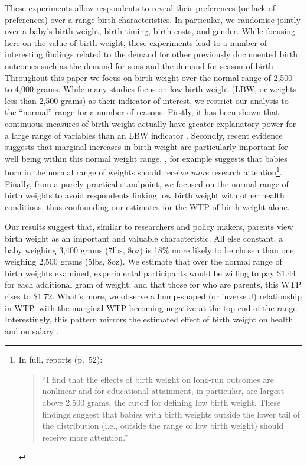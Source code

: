 \documentclass[a4paper, 11pt]{article}
\begin{document}
\begin{spacing}{1.4}
These experiments allow respondents to reveal their preferences (or lack
of preferences) over a range birth characteristics.  In particular, we
randomise jointly over a baby's birth weight, birth timing, birth costs,
and gender.  While focusing here on the value of birth weight, these
experiments lead to a number of interesting findings related to the
demand for other previously documented birth outcomes such as the demand
for sons \citep{DahlMoretti2008} and the demand for season of birth
\citep{Clarkeetal2016}.  Throughout this paper
we focus on birth weight over the normal range of 2,500 to 4,000 grams.
While many studies focus on low birth weight (LBW, or weights less than
2,500 grams) as their indicator of interest, we restrict our analysis
to the ``normal'' range for a number of reasons.  Firstly, it has been
shown that continuous measures of birth weight actually have greater
explanatory power for a large range of variables than an LBW indicator
\citep{Blacketal2007}.  Secondly, recent evidence suggests that marginal
increases in birth weight are particularly important for well being within
this normal weight range.  \citet{Royer2009}, for example suggests that
babies born in the normal range of weights should receive \emph{more}
research attention\footnote{In full, \citep{Royer2009} reports (p.\ 52):
  \begin{quote} ``I find that the effects of birth weight on long-run
    outcomes are nonlinear and for educational attainment, in particular,
    are largest above 2,500 grams, the cutoff for defining low birth weight.
    These findings suggest that babies with birth weights outside the
    lower tail of the distribution (i.e., outside the range of low birth
    weight) should receive more attention.''
  \end{quote}
}.  Finally, from a purely practical standpoint, we focused on the
normal range of birth weights to avoid respondents linking low birth
weight with other health conditions, thus confounding our estimates
for the WTP of birth weight alone.

Our results suggest that, similar to researchers and policy makers,
parents view birth weight as an important and valuable characteristic.
All else constant, a baby weighing 3,400 grams (7lbs, 8oz) is 18\%
more likely to be chosen than one weighing 2,500 grams (5lbs, 8oz).
We estimate that over the normal range of birth weights examined,
experimental participants would be willing to pay \$1.44 for each
additional gram of weight, and that those for who are parents, this
WTP rises to \$1.72.  What's more, we observe a hump-shaped (or inverse
J) relationship in WTP, with the marginal WTP becoming negative
at the top end of the range.  Interestingly, this pattern mirrors
the estimated effect of birth weight on health \citep{Caseetal2005}
and on salary \citep{BehrmanRosenzweig2004}.


\end{spacing}
\end{document}
